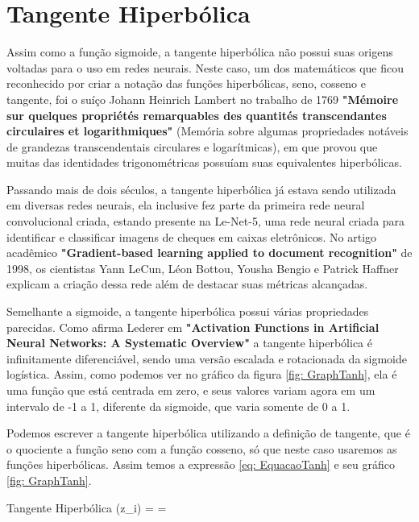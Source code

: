 \section{Tangente Hiperbólica}

Assim como a função sigmoide, a tangente hiperbólica não possui suas origens voltadas para o uso em redes neurais. Neste caso, um dos matemáticos que ficou reconhecido por criar a notação das funções hiperbólicas, seno, cosseno e tangente, foi o suíço Johann Heinrich Lambert no trabalho de 1769 \textbf{"Mémoire sur quelques propriétés remarquables des quantités transcendantes circulaires et logarithmiques"} (Memória sobre algumas propriedades notáveis de grandezas transcendentais circulares e logarítmicas), em que provou que muitas das identidades trigonométricas possuíam suas equivalentes hiperbólicas.

Passando mais de dois séculos, a tangente hiperbólica já estava sendo utilizada em diversas redes neurais, ela inclusive fez parte da primeira rede neural convolucional criada, estando presente na Le-Net-5, uma rede neural criada para identificar e classificar imagens de cheques em caixas eletrônicos. No artigo acadêmico \textbf{"Gradient-based learning applied to document recognition"} de 1998, os cientistas Yann LeCun, Léon Bottou, Yousha Bengio e Patrick Haffner explicam a criação dessa rede além de destacar suas métricas alcançadas.

Semelhante a sigmoide, a tangente hiperbólica possui várias propriedades parecidas. Como afirma Lederer em \textbf{"Activation Functions in Artificial Neural Networks: A Systematic Overview"} a tangente hiperbólica é infinitamente diferenciável, sendo uma versão escalada e rotacionada da sigmoide logística. Assim, como podemos ver no gráfico da figura \ref{fig: GraphTanh}, ela é uma função que está centrada em zero, e seus valores variam agora em um intervalo de -1 a 1, diferente da sigmoide, que varia somente de 0 a 1.

Podemos escrever a tangente hiperbólica utilizando a definição de tangente, que é o quociente a função seno com a função cosseno, só que neste caso usaremos as funções hiperbólicas. Assim temos a expressão \ref{eq: EquacaoTanh} e seu gráfico \ref{fig: GraphTanh}.

\begin{equacaodestaque}{Tangente Hiperbólica}
    \tanh(z_i) =  = 
    \label{eq:tangente-hiperbolica}
\end{equacaodestaque}

